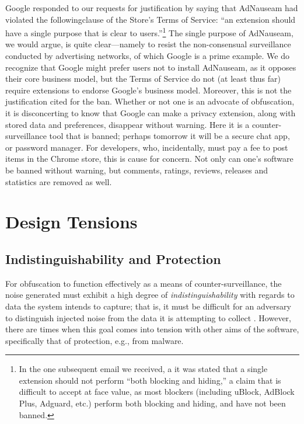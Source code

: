 \documentclass[conference]{IEEEtran}
\begin{document}
Google responded to our requests for justification by saying that AdNauseam had violated the followingclause of the Store's Terms of Service: “an extension should have a single purpose that is clear to users.”\footnote{In the one subsequent email we received, a it was stated that a single extension should not perform “both blocking and hiding,” a claim that is difficult to accept at face value, as most blockers (including uBlock, AdBlock Plus, Adguard, etc.) perform both blocking and hiding, and have not been banned.} The single purpose of AdNauseam, we would argue, is quite clear---namely to resist the non-consensual surveillance conducted by advertising networks, of which Google is a prime example. We do recognize that Google might prefer users not to install AdNauseam, as it opposes their core business model, but the Terms of Service do not (at least thus far) require extensions to endorse Google's business model. Moreover, this is not the justification cited for the ban. Whether or not one is an advocate of obfuscation, it is disconcerting to know that Google can make a privacy extension, along with stored data and preferences, disappear without warning. Here it is a counter-surveillance tool that is banned; perhaps tomorrow it will be a secure chat app, or password manager. For developers, who, incidentally, must pay a fee to post items in the Chrome store, this is cause for concern. Not only can one's software be banned without warning, but comments, ratings, reviews, releases and statistics are removed as well.


\section{Design Tensions}

\subsection{Indistinguishability and Protection}

For obfuscation to function effectively as a means of counter-surveillance, the noise generated must exhibit a high degree of \emph{indistinguishability} with regards to data the system intends to capture; that is, it must be difficult for an adversary to distinguish injected noise from the data it is attempting to collect \cite{Gervais}. However, there are times when this goal comes into tension with other aims of the software, specifically that of protection, e.g., from malware.
\end{document}
